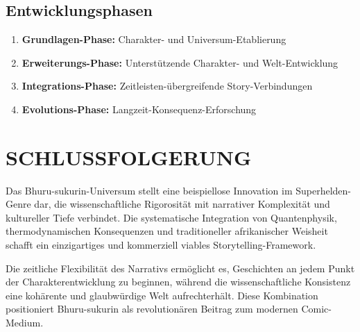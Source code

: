 \documentclass[12pt,a4paper]{article}
\begin{document}
\subsection{Entwicklungsphasen}
\begin{enumerate}
\item \textbf{Grundlagen-Phase:} Charakter- und Universum-Etablierung
\item \textbf{Erweiterungs-Phase:} Unterstützende Charakter- und Welt-Entwicklung
\item \textbf{Integrations-Phase:} Zeitleisten-übergreifende Story-Verbindungen
\item \textbf{Evolutions-Phase:} Langzeit-Konsequenz-Erforschung
\end{enumerate}

\section{SCHLUSSFOLGERUNG}

Das Bhuru-sukurin-Universum stellt eine beispiellose Innovation im Superhelden-Genre dar, die wissenschaftliche Rigorosität mit narrativer Komplexität und kultureller Tiefe verbindet. Die systematische Integration von Quantenphysik, thermodynamischen Konsequenzen und traditioneller afrikanischer Weisheit schafft ein einzigartiges und kommerziell viables Storytelling-Framework.

Die zeitliche Flexibilität des Narrativs ermöglicht es, Geschichten an jedem Punkt der Charakterentwicklung zu beginnen, während die wissenschaftliche Konsistenz eine kohärente und glaubwürdige Welt aufrechterhält. Diese Kombination positioniert Bhuru-sukurin als revolutionären Beitrag zum modernen Comic-Medium.
\end{document}
